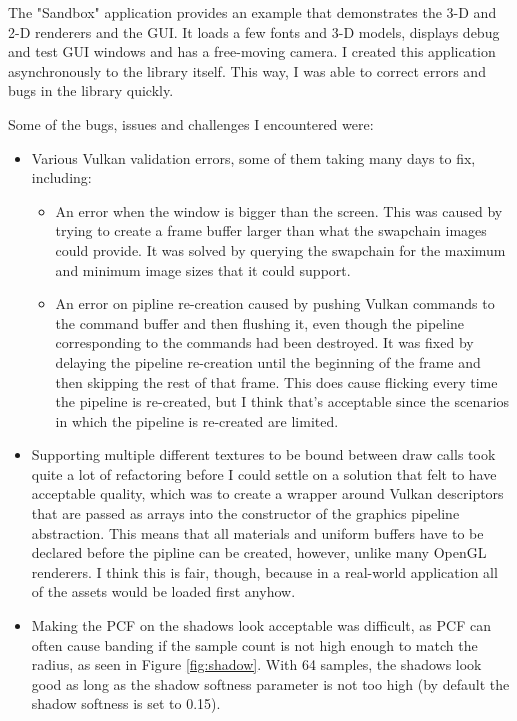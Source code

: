 \documentclass[8pt]{article}
\begin{document}
\begin{multicols}{2}
			The "Sandbox" application provides an example that demonstrates the
			3-D and 2-D renderers and the GUI. It loads a few fonts and 3-D models,
			displays debug and test GUI windows and has a free-moving camera.
			I created this application asynchronously to the library itself. This
			way, I was able to correct errors and bugs in the library quickly.
			
			Some of the bugs, issues and challenges I encountered were:
				\begin{itemize}
					\item Various Vulkan validation errors, some of them taking
						many days to fix, including:
						\begin{itemize}
							\item An error when the window is bigger than the
								screen. This was caused by trying to create a
								frame buffer larger than what the swapchain
								images could provide. It was solved by querying
								the swapchain for the maximum and minimum image
								sizes that it could support.
							\item An error on pipline re-creation caused by
								pushing Vulkan commands to the command buffer
								and then flushing it, even though the pipeline
								corresponding to the commands had been destroyed.
								It was fixed by delaying the pipeline re-creation
								until the beginning of the frame and then
								skipping the rest of that frame. This does cause
								flicking every time the pipeline is re-created,
								but I think that's acceptable since the scenarios
								in which the pipeline is re-created are limited.
						\end{itemize}
					\item Supporting multiple different textures to be bound between
						draw calls took quite a lot of refactoring before I could
						settle on a solution that felt to have acceptable quality,
						which was to create a wrapper around Vulkan descriptors
						that are passed as arrays into the constructor of the
						graphics pipeline abstraction. This means that all materials
						and uniform buffers have to be declared before the pipline
						can be created, however, unlike many OpenGL renderers. I
						think this is fair, though, because in a real-world
						application all of the assets would be loaded first anyhow.
					\item Making the PCF on the shadows look acceptable was
						difficult, as PCF can often cause banding if the sample
						count is not high enough to match the radius, as seen in
						Figure \ref{fig:shadow}. With 64 samples, the shadows look
						good as long as the shadow softness parameter is not too
						high (by default the shadow softness is set to 0.15).
				\end{itemize}


\end{multicols}
\end{document}
